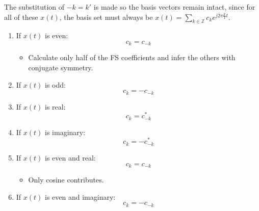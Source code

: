 \begin{derivation}
\begin{enumerate}
    \end{enumerate}
\end{derivation}

\begin{warning}
    The substitution of $-k=k'$ is made so the basis vectors remain intact, since for all of these $x(t)$, the basis set must always be $x(t) = \sum_{k \in \mathbb{Z}} c_k e^{j 2\pi \frac{k}{T} t}$.
\end{warning}

\begin{intuition}
    \begin{enumerate}
        \item If $x(t)$ is even: 
        \begin{equation*}
            c_k = c_{-k}
        \end{equation*}
        \begin{itemize}
            \item Calculate only half of the FS coefficients and infer the others with conjugate symmetry.
        \end{itemize}
        \item If $x(t)$ is odd:
        \begin{equation*}
            c_k = - c_{-k}
        \end{equation*}
        \item If $x(t)$ is real:
        \begin{equation*}
            c_k = c_{-k}^*
        \end{equation*}
        \item If $x(t)$ is imaginary:
        \begin{equation*}
            c_k = - c_{-k}^*
        \end{equation*}    
        \item If \( x(t) \) is even and real: 
        \begin{equation*}
            c_k = c_{-k}
        \end{equation*}
        \begin{itemize}
            \item Only cosine contributes.
        \end{itemize}
        
        \item If \( x(t) \) is even and imaginary: 
        \begin{equation*}
            c_k = -c_{-k}
        \end{equation*}
    

\end{enumerate}
\end{intuition}
